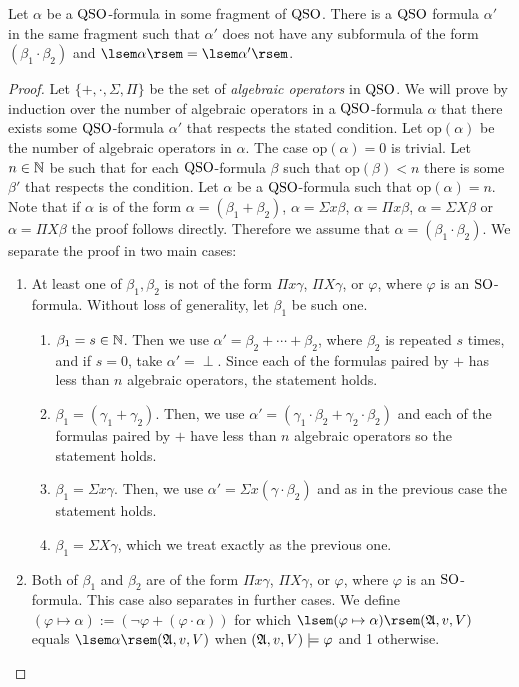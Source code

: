 \begin{theorem}
	Let $\alpha$ be a ${\rm QSO}$-formula in some fragment of ${\rm QSO}$. There is a ${\rm QSO}$ formula $\alpha'$ in the same fragment such that $\alpha'$ does not have any subformula of the form $(\beta_1 \cdot \beta_2)$ and $\sem{\alpha} = \sem{\alpha'}$.
\end{theorem}
\begin{proof}
	Let $\{+, \cdot, \Sigma, \Pi\}$ be the set of {\it algebraic operators} in ${\rm QSO}$. We will prove by induction over the number of algebraic operators in a ${\rm QSO}$-formula $\alpha$ that there exists some ${\rm QSO}$-formula $\alpha'$ that respects the stated condition. Let $\text{op}(\alpha)$ be the number of algebraic operators in $\alpha$. The case $\text{op}(\alpha) = 0$ is trivial. Let $n\in\mathbb{N}$ be such that for each ${\rm QSO}$-formula $\beta$ such that $\text{op}(\beta) < n$ there is some $\beta'$ that respects the condition. Let $\alpha$ be a ${\rm QSO}$-formula such that $\text{op}(\alpha) = n$. Note that if $\alpha$ is of the form $\alpha = (\beta_1 + \beta_2)$, $\alpha = \Sigma x \beta$, $\alpha = \Pi x \beta$, $\alpha = \Sigma X \beta$ or $\alpha = \Pi X \beta$ the proof follows directly. Therefore we assume that $\alpha = (\beta_1 \cdot \beta_2)$. We separate the proof in two main cases:
	\begin{enumerate}
		\item At least one of $\beta_1, \beta_2$ is not of the form $\Pi x \gamma$, $\Pi X \gamma$, or $\varphi$, where $\varphi$ is an ${\rm SO}$-formula. Without loss of generality, let $\beta_1$ be such one.
		\begin{enumerate}
			\item $\beta_1 = s \in \mathbb{N}$. Then we use $\alpha' = \beta_2 + \cdots + \beta_2$, where $\beta_2$ is repeated $s$ times, and if $s = 0$, take $\alpha' = \perp$. Since each of the formulas paired by $+$ has less than $n$ algebraic operators, the statement holds.
			\item $\beta_1 = (\gamma_1 + \gamma_2)$. Then, we use $\alpha' = (\gamma_1\cdot\beta_2 + \gamma_2\cdot\beta_2)$ and each of the formulas paired by $+$ have less than $n$ algebraic operators so the statement holds.
			\item $\beta_1 = \Sigma x \gamma$. Then, we use $\alpha' = \Sigma x (\gamma\cdot\beta_2)$ and as in the previous case the statement holds.
			\item $\beta_1 = \Sigma X \gamma$, which we treat exactly as the previous one.
		\end{enumerate}
		\item Both of $\beta_1$ and $\beta_2$ are of the form $\Pi x \gamma$, $\Pi X \gamma$, or $\varphi$, where $\varphi$ is an ${\rm SO}$-formula. This case also separates in further cases. We define $(\varphi \mapsto \alpha) := (\neg\varphi + (\varphi\cdot\alpha))$ for which $\sem{(\varphi \mapsto \alpha)}(\A,v,V)$ equals $\sem{\alpha}(\A,v,V)$ when $(\mathfrak{A},v,V)\models\varphi$ and 1 otherwise.

\end{enumerate}
\end{proof}
